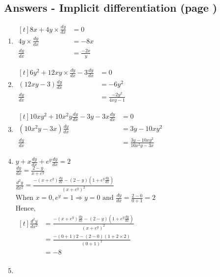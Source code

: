 \documentclass[../main.tex]{subfiles}
\begin{document}
\subsection*{Answers - Implicit differentiation (page \pageref{Implicit Differentiation})}

\begin{spacing}{1.5}
\begin{enumerate}
    \item
    $
    \!
    \begin{aligned}[t]
        8x + 4y\times\frac{dy}{dx}
        &= 0 \\
        4y\times\frac{dy}{dx}
        &=-8x\\
        \frac{dy}{dx}
        &=\frac{-2x}{y}
    \end{aligned}
    $
    \item 
    $
    \!
    \begin{aligned}[t]
        6y^2+12xy\times\frac{dy}{dx}-3\frac{dy}{dx}
        &=0\\
        (12xy-3)\frac{dy}{dx}
        &=-6y^2\\
        \frac{dy}{dx}
        &=\frac{-2y^2}{4xy-1}
    \end{aligned}
    $
    \item 
    $
    \!
    \begin{aligned}[t]
        10xy^2+10x^2y\frac{dy}{dx}-3y-3x\frac{dy}{dx}
        &=0\\
        (10x^2y-3x)\frac{dy}{dx}
        &=3y-10xy^2\\
        \frac{dy}{dx}
        &=\frac{3y-10xy^2}{10x^2y-3x}
    \end{aligned}
    $
    \item 
    \(y+x\frac{dy}{dx}+e^y\frac{dy}{dx}=2\)\\
    \(\frac{dy}{dx}=\frac{2-y}{x+e^y} \) \\
    \(\frac{d^2y}{dx^2}=\frac{-(x+e^y)\frac{dy}{dx}-(2-y)(1+e^y\frac{dy}{dx})}{(x+e^y)^2}\)\\
    When \(x=0, e^y=1\Rightarrow{}y=0\text{ and }\frac{dy}{dx}=\frac{2-0}{0+1}=2\)\\
    Hence,\\
    $
    \!
    \begin{aligned}[t]
        \frac{d^2y}{dx^2}
        &=\frac{-(x+e^y)\frac{dy}{dx}-(2-y)(1+e^y\frac{dy}{dx})}{(x+e^y)^2}\\
        &=\frac{-(0+1)2-(2-0)(1+2\times2)}{(0+1)^2}\\
        &=-8\\
    \end{aligned}
    $
    \item 
    

\end{enumerate}
\end{spacing}
\end{document}
